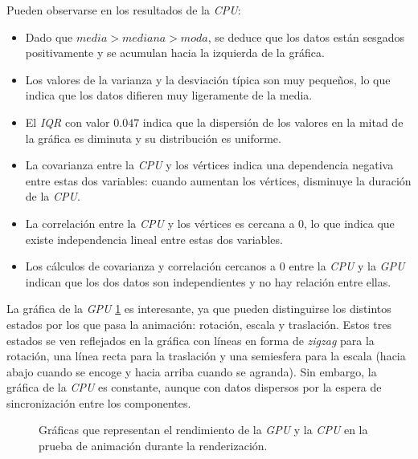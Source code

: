 Pueden observarse en los resultados de la \textit{CPU}:
\begin{itemize}

    \item Dado que $media > mediana > moda$, se deduce que los datos están sesgados positivamente y se acumulan hacia la izquierda de la gráfica.

    \item Los valores de la varianza y la desviación típica son muy pequeños, lo que indica que los datos difieren muy ligeramente de la media.

    \item El \textit{IQR} con valor $0.047$ indica que la dispersión de los valores en la mitad de la gráfica es diminuta y su distribución es uniforme.

    \item La covarianza entre la \textit{CPU} y los vértices indica una dependencia negativa entre estas dos variables: cuando aumentan los vértices, disminuye la duración de la \textit{CPU}.

    \item La correlación entre la \textit{CPU} y los vértices es cercana a $0$, lo que indica que existe independencia lineal entre estas dos variables.

    \item Los cálculos de covarianza y correlación cercanos a $0$ entre la \textit{CPU} y la \textit{GPU} indican que los dos datos son independientes y no hay relación entre ellas.

\end{itemize}

La gráfica de la \textit{GPU} \ref{fig:animation-graphs-render} es interesante, ya que pueden distinguirse los distintos estados por los que pasa la animación: rotación, escala y traslación. Estos tres estados se ven reflejados en la gráfica con líneas en forma de \textit{zigzag} para la rotación, una línea recta para la traslación y una semiesfera para la escala (hacia abajo cuando se encoge y hacia arriba cuando se agranda). Sin embargo, la gráfica de la \textit{CPU} es constante, aunque con datos dispersos por la espera de sincronización entre los componentes.

\begin{figure}[htp]
    \centering
    
    \caption{Gráficas que representan el rendimiento de la \textit{GPU} y la \textit{CPU} en la prueba de animación durante la renderización.}
    \label{fig:animation-graphs-render}
\end{figure}

